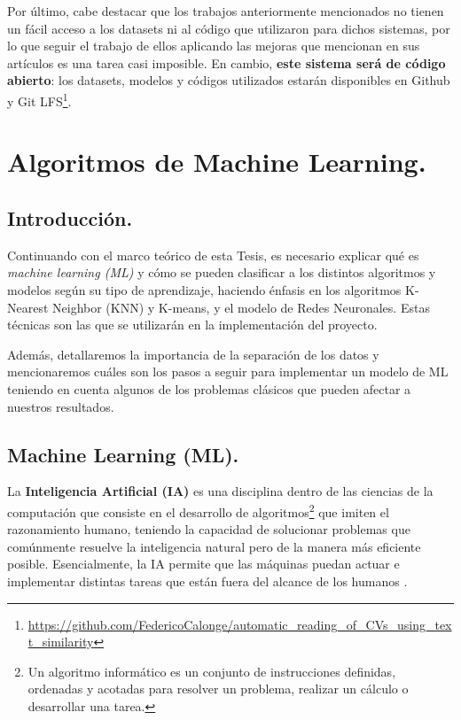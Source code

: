 \documentclass[12pt,a4paper]{article}
\begin{document}
\begin{sloppypar}
Por último, cabe destacar que los trabajos anteriormente mencionados no tienen un fácil acceso a los datasets ni al código que utilizaron para dichos sistemas, por lo que seguir el trabajo de ellos aplicando las mejoras que mencionan en sus artículos es una tarea casi imposible. En cambio, \textbf{este sistema será de código abierto}: los datasets, modelos y códigos utilizados estarán disponibles en Github y Git LFS\footnote{\url{https://github.com/FedericoCalonge/automatic_reading_of_CVs_using_text_similarity}}.

\cleardoublepage    %

\section{Algoritmos de Machine Learning.}\label{3.AlgoritmosdeMachineLearning}

\subsection{Introducción.}
Continuando con el marco teórico de esta Tesis, es necesario explicar qué es \textit{machine learning (ML)} y cómo se pueden clasificar a los distintos algoritmos y modelos según su tipo de aprendizaje, haciendo énfasis en los algoritmos K-Nearest Neighbor (KNN) y K-means, y el modelo de Redes Neuronales. Estas técnicas son las que se utilizarán en la implementación del proyecto.

Además, detallaremos la importancia de la separación de los datos y mencionaremos cuáles son los pasos a seguir para implementar un modelo de ML teniendo en cuenta algunos de los problemas clásicos que pueden afectar a nuestros resultados.

\subsection{Machine Learning (ML).} 

La \textbf{Inteligencia Artificial (IA)} es una disciplina dentro de las ciencias de la computación que consiste en el desarrollo de algoritmos\footnote{Un algoritmo informático es un conjunto de instrucciones definidas, ordenadas y acotadas para resolver un problema, realizar un cálculo o desarrollar una tarea.} que imiten el razonamiento humano, teniendo la capacidad de solucionar problemas que comúnmente resuelve la inteligencia natural pero de la manera más eficiente posible. 
Esencialmente, la IA permite que las máquinas puedan actuar e implementar distintas tareas que están fuera del alcance de los humanos \cite{intro_algos_ML}.


\end{sloppypar}
\end{document}
